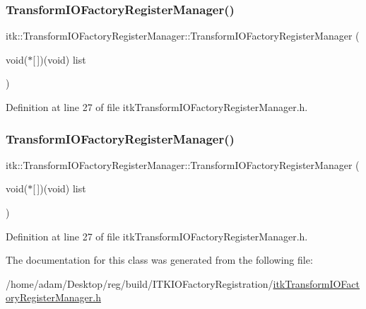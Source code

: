 \subsubsection{\texorpdfstring{Transform\+I\+O\+Factory\+Register\+Manager()}{TransformIOFactoryRegisterManager()}\hspace{0.1cm}{\footnotesize\ttfamily [1/2]}}
{\footnotesize\ttfamily itk\+::\+Transform\+I\+O\+Factory\+Register\+Manager\+::\+Transform\+I\+O\+Factory\+Register\+Manager (\begin{DoxyParamCaption}\item[{void($\ast$\mbox{[}$\,$\mbox{]})(void)}]{list }\end{DoxyParamCaption})\hspace{0.3cm}{\ttfamily [inline]}}



Definition at line 27 of file itk\+Transform\+I\+O\+Factory\+Register\+Manager.\+h.

\mbox{\label{classitk_1_1_transform_i_o_factory_register_manager_aefb761ca3bfca773fe91c4861c19e4f8}} 
\subsubsection{\texorpdfstring{Transform\+I\+O\+Factory\+Register\+Manager()}{TransformIOFactoryRegisterManager()}\hspace{0.1cm}{\footnotesize\ttfamily [2/2]}}
{\footnotesize\ttfamily itk\+::\+Transform\+I\+O\+Factory\+Register\+Manager\+::\+Transform\+I\+O\+Factory\+Register\+Manager (\begin{DoxyParamCaption}\item[{void($\ast$\mbox{[}$\,$\mbox{]})(void)}]{list }\end{DoxyParamCaption})\hspace{0.3cm}{\ttfamily [inline]}}



Definition at line 27 of file itk\+Transform\+I\+O\+Factory\+Register\+Manager.\+h.



The documentation for this class was generated from the following file\+:\begin{DoxyCompactItemize}
\item 
/home/adam/\+Desktop/reg/build/\+I\+T\+K\+I\+O\+Factory\+Registration/\hyperlink{build_2_i_t_k_i_o_factory_registration_2itk_transform_i_o_factory_register_manager_8h}{itk\+Transform\+I\+O\+Factory\+Register\+Manager.\+h}\end{DoxyCompactItemize}
